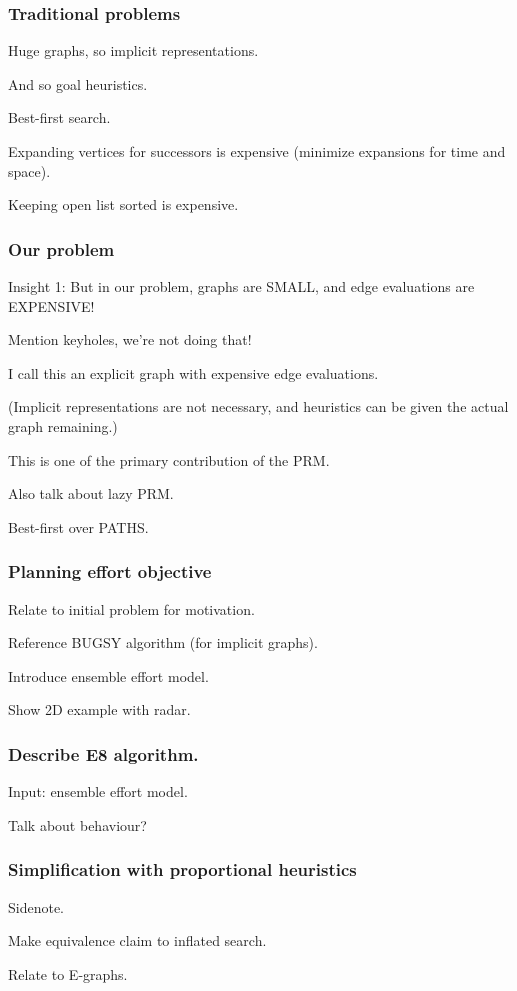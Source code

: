 \documentclass[serif]{beamer}
\begin{document}
\begin{frame}
   \frametitle{Traditional problems}
   
   Huge graphs, so implicit representations.
   
   And so goal heuristics.
   
   Best-first search.
   
   Expanding vertices for successors is expensive (minimize expansions
   for time and space).
   
   Keeping open list sorted is expensive.
\end{frame}

\begin{frame}
   \frametitle{Our problem}
   
   Insight 1:
   But in our problem, graphs are SMALL,
   and edge evaluations are EXPENSIVE!
   
   Mention keyholes, we're not doing that!
   
   I call this an explicit graph with expensive edge evaluations.
   
   (Implicit representations are not necessary,
   and heuristics can be given the actual graph remaining.)
   
   This is one of the primary contribution of the PRM.
   
   Also talk about lazy PRM.
   
   Best-first over PATHS.
\end{frame}

\begin{frame}
   \frametitle{Planning effort objective}

   Relate to initial problem for motivation.

   Reference BUGSY algorithm (for implicit graphs).

   Introduce ensemble effort model.
   
   Show 2D example with radar.
\end{frame}

\begin{frame}
   \frametitle{Describe E8 algorithm.}
   
   Input: ensemble effort model.

   Talk about behaviour?
\end{frame}

\begin{frame}
   \frametitle{Simplification with proportional heuristics}

   Sidenote.

   Make equivalence claim to inflated search.
   
   Relate to E-graphs.
\end{frame}
\end{document}
